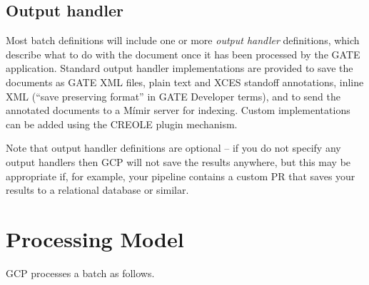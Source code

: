 \subsection*{Output handler}

Most batch definitions will include one or more {\em output handler}
definitions, which describe what to do with the document once it has been
processed by the GATE application.  Standard output handler implementations are
provided to save the documents as GATE XML files, plain text and XCES standoff
annotations, inline XML (``save preserving format'' in GATE Developer terms),
and to send the annotated documents to a M\'{i}mir server for indexing.
Custom implementations can be added using the CREOLE plugin mechanism.

Note that output handler definitions are optional -- if you do not specify any
output handlers then GCP will not save the results anywhere, but this may be
appropriate if, for example, your pipeline contains a custom PR that saves your
results to a relational database or similar.


\section{Processing Model}

GCP processes a batch as follows.

